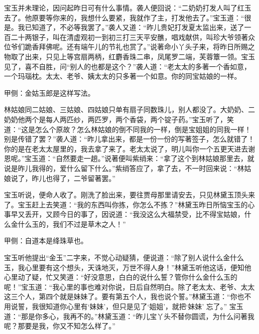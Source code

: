 \begin{parag}
    宝玉并未理论，因问起昨日可有什么事情。袭人便回说：“二奶奶打发人叫了红玉去了。他原要等你来的，我想什么要紧，我就作了主，打发他去了。”宝玉道：“很是。我已知道了，不必等我罢了。”袭人又道：“昨儿贵妃打发夏太监出来，送了一百二十两银子，叫在清虚观初一到初三打三天平安醮，唱戏献供，叫珍大爷领著众位爷们跪香拜佛呢。还有端午儿的节礼也赏了。”说著命小丫头子来，将昨日所赐之物取了出来，只见上等宫扇两柄，红麝香珠二串，凤尾罗二端，芙蓉簟一领。宝玉见了，喜不自胜，问“别人的也都是这个？”袭人道：“老太太的多著一个香如意，一个玛瑙枕。太太、老爷、姨太太的只多著一个如意。你的同宝姑娘的一样。\begin{note}甲侧：金姑玉郎是这样写法。\end{note}林姑娘同二姑娘、三姑娘、四姑娘只单有扇子同数珠儿，别人都没了。大奶奶、二奶奶他两个是每人两匹纱，两匹罗，两个香袋，两个锭子药。”宝玉听了，笑道：“这是怎么个原故？怎么林姑娘的倒不同我的一样，倒是宝姐姐的同我一样！别是传错了罢？”袭人道：“昨儿拿出来，都是一份一份的写著签子，怎么就错了！你的是在老太太屋里的，我去拿了来了。老太太说了，明儿叫你一个五更天进去谢恩呢。”宝玉道：“自然要走一趟。”说著便叫紫绡来：“拿了这个到林姑娘那里去，就说是昨儿我得的，爱什么留下什么。”紫绡答应了，拿了去，不一时回来说：“林姑娘说了，昨儿也得了，二爷留著罢。”
\end{parag}


\begin{parag}
    宝玉听说，便命人收了。刚洗了脸出来，要往贾母那里请安去，只见林黛玉顶头来了。宝玉赶上去笑道：“我的东西叫你拣，你怎么不拣？”林黛玉昨日所恼宝玉的心事早又丢开，又顾今日的事了，因说道：“我没这么大福禁受，比不得宝姑娘，什么金什么玉的，我们不过是草木之人！”\begin{note}甲侧：自道本是绛珠草也。\end{note}宝玉听他提出“金玉”二字来，不觉心动疑猜，便说道：“除了别人说什么金什么玉，我心里要有这个想头，天诛地灭，万世不得人身！”林黛玉听他这话，便知他心里动了疑，忙又笑道：“好没意思，白白的说什么誓？管你什么金什么玉的呢！”宝玉道：“我心里的事也难对你说，日后自然明白。除了老太太、老爷、太太这三个人，第四个就是妹妹了。要有第五个人，我也说个誓。”林黛玉道：“你也不用说誓，我很知道你心里有‘妹妹’，但只是见了‘姐姐’，就把‘妹妹’ 忘了。” 宝玉道：“那是你多心，我再不的。”林黛玉道：“昨儿宝丫头不替你圆谎，为什么问著我呢？那要是我，你又不知怎么样了。”
\end{parag}


